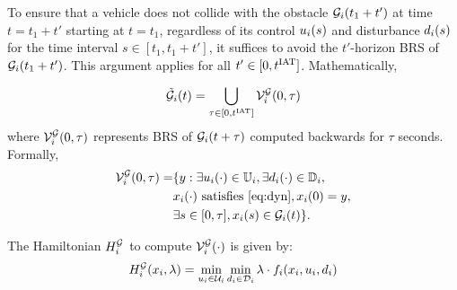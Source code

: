 To ensure that a vehicle does not collide with the obstacle $\mathcal{G}_i(t_1 + t')$ at time $t = t_1 + t'$ starting at $t = t_1$, regardless of its control $u_i(s)$ and disturbance $d_i(s)$ for the time interval $s \in [t_1, t_1 + t']$, it suffices to avoid the $t'$-horizon BRS of $\mathcal{G}_i(t_1 + t')$. This argument applies for all $t' \in [0, t^\text{IAT}]$. Mathematically,

\begin{equation} \label{eqn:inducedobs}
\tilde\obsset_i(t) = \bigcup_{\tau \in [0, \iat]} \brs^{\mathcal{G}}_{i}(0, \tau)
\end{equation}
where $\mathcal{V}^{\mathcal{G}}_{i}(0, \tau)$ represents BRS of $\mathcal{G}_i(t+\tau)$ computed backwards for $\tau$ seconds. Formally, 
\begin{equation} \label{eqn:inducedobs_help1}
\begin{aligned}
\brs^{\mathcal{G}}_{i}(0, \tau) = & \{y: \exists \ctrl_i(\cdot) \in \cfset_i, \exists \dstb_i(\cdot) \in \dfset_i, \\
& \state_i(\cdot) \text{ satisfies \eqref{eq:dyn}}, \state_i(0) = y, \\
& \exists s \in [0, \tau], \state_i(s) \in \obsset_i(t)\}.
\end{aligned}
\end{equation}

The Hamiltonian $H^{\mathcal{G}}_{i}$ to compute $\mathcal{V}^{\mathcal{G}}_{i}(\cdot)$ is given by:
\begin{equation} \label{eqn:BRS_obsham}
\ham^{\mathcal{G}}_{i}(\state_i, \costate) = \min_{\ctrl_i \in \cset_i} \min_{\dstb_i \in \dset_i} \costate \cdot f_i (\state_i, \ctrl_i, \dstb_i)
\end{equation}

